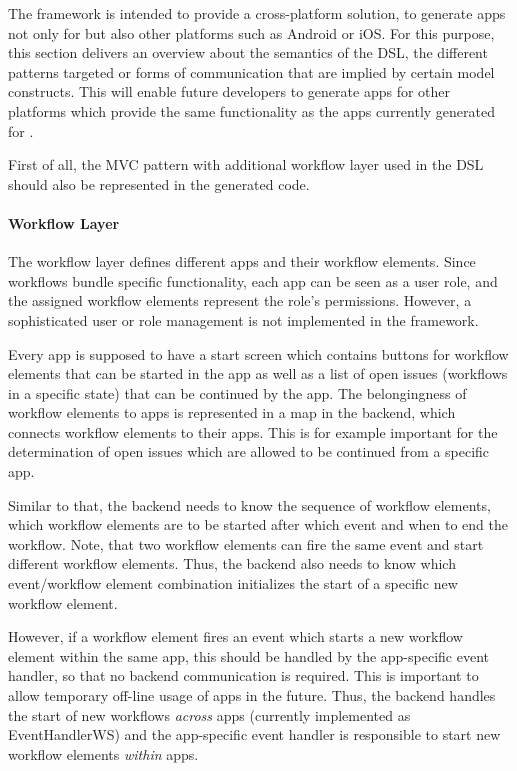 
The \MD framework is intended to provide a cross-platform solution, \ie to generate apps not only for \mapapps but also other platforms such as Android or iOS. For this purpose, this section delivers an overview about the semantics of the DSL, \eg the different patterns targeted or forms of communication that are implied by certain model constructs. This will enable future developers to generate apps for other platforms which provide the same functionality as the apps currently generated for \mapapps.

First of all, the MVC pattern with additional workflow layer used in the DSL should also be represented in the generated code.

\paragraph*{Workflow Layer}
The workflow layer defines different apps and their workflow elements. Since workflows bundle specific functionality, each app can be seen as a user role, and the assigned workflow elements represent the role's permissions. However, a sophisticated user or role management is not implemented in the \MD framework.

Every app is supposed to have a start screen which contains buttons for workflow elements that can be started in the app as well as a list of open issues (workflows in a specific state) that can be continued by the app. The belongingness of workflow elements to apps is represented in a map in the backend, which connects workflow elements to their apps. This is for example important for the determination of open issues which are allowed to be continued from a specific app.

Similar to that, the backend needs to know the sequence of workflow elements, \ie which workflow elements are to be started after which event and when to end the workflow. Note, that two workflow elements can fire the same event and start different workflow elements. Thus, the backend also needs to know which event/workflow element combination initializes the start of a specific new workflow element.

However, if a workflow element fires an event which starts a new workflow element within the same app, this should be handled by the app-specific event handler, so that no backend communication is required. This is important to allow temporary off-line usage of apps in the future. Thus, the backend handles the start of new workflows \textit{across} apps (currently implemented as EventHandlerWS) and the app-specific event handler is responsible to start new workflow elements \textit{within} apps.

